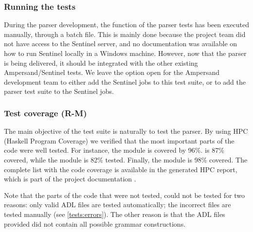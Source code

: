   \subsubsection{Running the tests}
  During the parser development, the  function of the parser tests has been executed manually, through a batch file.
  This is mainly done because the project team did not have access to the Sentinel server, and no documentation was available on how to run Sentinel locally in a Windows machine.
  However, now that the parser is being delivered, it should be integrated with the other existing Ampersand/Sentinel tests.
  We leave the option open for the Ampersand development team to either add the Sentinel jobs to this test suite, or to add the parser test suite to the Sentinel jobs.
  
  \subsubsection{Test coverage (R-M)}
  The main objective of the test suite is naturally to test the parser.
  By using HPC (Haskell Program Coverage) we verified that the most important parts of the code were well tested.
  For instance, the  module is covered by 96\%.
   is 87\% covered, while the module  is 82\% tested.
  Finally, the module  is 98\% covered.
  The complete list with the code coverage is available in the generated HPC report, which is part of the project documentation .
  
  Note that the parts of the code that were not tested, could not be tested for two reasons: only valid ADL files are tested automatically; the incorrect files are tested manually (see \autoref{tests:errors}).
  The other reason is that the ADL files provided did not contain all possible grammar constructions.
  